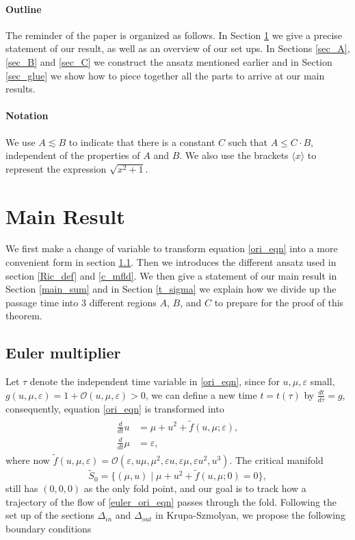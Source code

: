 \documentclass[letterpaper,11pt]{article}
\newcommand{\rmO}{\mathcal{O}}
\newcommand{\eps}{\varepsilon}
\newcommand{\lar}{ \lesssim }
\numberwithin{equation}{section}
\theoremstyle{plain}
\begin{document}
\paragraph{Outline}
The reminder of the paper is organized as follows. In Section \ref{sec_main} we give a precise statement of our result, as well as an overview of our set ups. In Sections \ref{sec_A}, \ref{sec_B} and \ref{sec_C} we construct the ansatz mentioned earlier and in Section \ref{sec_glue} we show how to piece together all the parts to arrive at our main results.


\paragraph{Notation}
We use $A \lar B$ to indicate that there is a constant $C$ such that $A \le C \cdot B$, independent of the properties of $A$ and $B$. We also use the brackets $\langle x \rangle$ to represent the expression $\sqrt{x^2+1}$.



\section{Main Result}\label{sec_main}
We first make a change of variable to transform equation \eqref{ori_eqn} into a more convenient form in section \ref{euler_m}. Then we introduces the different ansatz used in section \ref{Ric_def} and \ref{c_mfld}. We then give a statement of our main result in Section \ref{main_sum} and in Section \ref{t_sigma} we explain how we divide up the passage time into 3 different regions $A$, $B$, and $C$ to prepare for the proof of this theorem.

\subsection{Euler multiplier}\label{euler_m}
Let $\tau$ denote the independent time variable in \eqref{ori_eqn}, since for $u,\mu,\eps$ small, $g(u,\mu,\eps) = 1 + \rmO(u,\mu,\eps)>0$, we can define a new time $t = t(\tau)$ by $\frac{dt}{d\tau} = g$, consequently, equation \eqref{ori_eqn}  is transformed into
\begin{align}\label{euler_ori_eqn}
\begin{split}
\frac{d}{dt}u &= \mu+u^2+ \tilde{f}(u,\mu;\eps),\\
\frac{d}{dt}\mu &=  \eps ,
\end{split}
\end{align}
where now $\tilde{f}(u,\mu,\eps) = \rmO(\eps,  u\mu, \mu^2,\eps u, \eps \mu, \eps u^2, u^3)$.  The critical manifold 
\[
\tilde{S}_0 = \{ (\mu, u) \mid \mu + u^2 + \tilde{f}(u,\mu;0) = 0\},
\]
still has $(0,0,0)$ as the only fold point, and our goal is to track how a trajectory of the flow of \eqref{euler_ori_eqn} passes through the fold. Following the set up of the sections $\Delta_{in}$ and $\Delta_{out}$ in Krupa-Szmolyan, we propose the following boundary conditions
\end{document}
